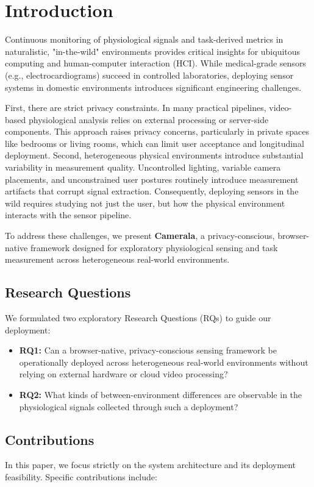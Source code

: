 \documentclass[final,3p,times,twocolumn]{elsarticle}
\begin{document}
\section{Introduction}

Continuous monitoring of physiological signals and task-derived metrics in naturalistic, "in-the-wild" environments provides critical insights for ubiquitous computing and human-computer interaction (HCI). While medical-grade sensors (e.g., electrocardiograms) succeed in controlled laboratories, deploying sensor systems in domestic environments introduces significant engineering challenges. 

First, there are strict privacy constraints. In many practical pipelines, video-based physiological analysis relies on external processing or server-side components. This approach raises privacy concerns, particularly in private spaces like bedrooms or living rooms, which can limit user acceptance and longitudinal deployment.
Second, heterogeneous physical environments introduce substantial variability in measurement quality. Uncontrolled lighting, variable camera placements, and unconstrained user postures routinely introduce measurement artifacts that corrupt signal extraction. Consequently, deploying sensors in the wild requires studying not just the user, but how the physical environment interacts with the sensor pipeline.

To address these challenges, we present \textbf{Camerala}, a privacy-conscious, browser-native framework designed for exploratory physiological sensing and task measurement across heterogeneous real-world environments.

\subsection{Research Questions}
We formulated two exploratory Research Questions (RQs) to guide our deployment:
\begin{itemize}
    \item \textbf{RQ1:} Can a browser-native, privacy-conscious sensing framework be operationally deployed across heterogeneous real-world environments without relying on external hardware or cloud video processing?
    \item \textbf{RQ2:} What kinds of between-environment differences are observable in the physiological signals collected through such a deployment?
\end{itemize}

\subsection{Contributions}
In this paper, we focus strictly on the system architecture and its deployment feasibility. Specific contributions include:
\end{document}
